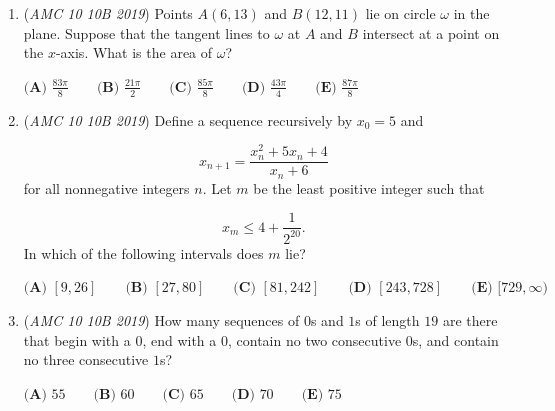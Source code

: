 \begin{enumerate}
 $\textbf{(A) } \frac{1}{7} \qquad\textbf{(B) } \frac{1}{4} \qquad\textbf{(C) } \frac{1}{3} \qquad\textbf{(D) } \frac{1}{2} \qquad\textbf{(E) } \frac{2}{3}$


	\item (\textit{AMC 10 10B 2019}) Points $A(6,13)$ and $B(12,11)$ lie on circle $\omega$ in the plane. Suppose that the tangent lines to $\omega$ at $A$ and $B$ intersect at a point on the $x$-axis. What is the area of $\omega$?


 $\textbf{(A) }\frac{83\pi}{8}\qquad\textbf{(B) }\frac{21\pi}{2}\qquad\textbf{(C) } \frac{85\pi}{8}\qquad\textbf{(D) }\frac{43\pi}{4}\qquad\textbf{(E) }\frac{87\pi}{8}$


	\item (\textit{AMC 10 10B 2019}) Define a sequence recursively by $x_0=5$ and

 \[x_{n+1}=\frac{x_n^2+5x_n+4}{x_n+6}\]for all nonnegative integers $n.$ Let $m$ be the least positive integer such that

 \[x_m\leq 4+\frac{1}{2^{20}}.\]In which of the following intervals does $m$ lie?


 $\textbf{(A) } [9,26] \qquad\textbf{(B) } [27,80] \qquad\textbf{(C) } [81,242]\qquad\textbf{(D) } [243,728] \qquad\textbf{(E) } [729,\infty)$


	\item (\textit{AMC 10 10B 2019}) How many sequences of $0$s and $1$s of length $19$ are there that begin with a $0$, end with a $0$, contain no two consecutive $0$s, and contain no three consecutive $1$s?


 $\textbf{(A) }55\qquad\textbf{(B) }60\qquad\textbf{(C) }65\qquad\textbf{(D) }70\qquad\textbf{(E) }75$


\end{enumerate}